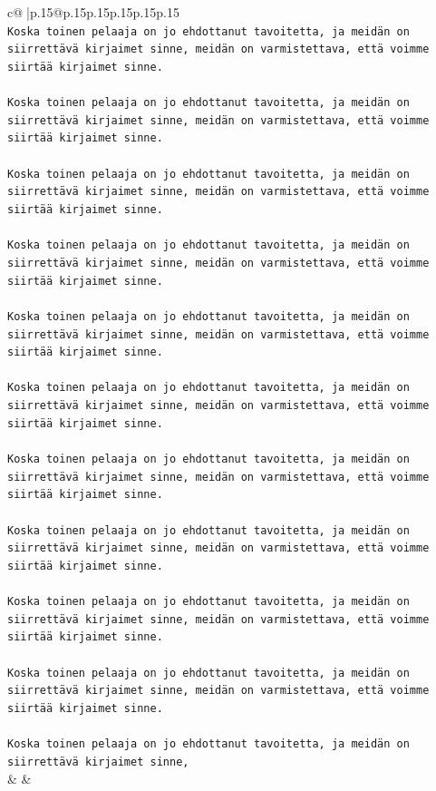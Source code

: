 \documentclass{article}
\begin{document}
{\begin{supertabular}{c@{$\;$}|p{.15\linewidth}@{}p{.15\linewidth}p{.15\linewidth}p{.15\linewidth}p{.15\linewidth}p{.15\linewidth}}
{{{\\ 
\texttt{Koska toinen pelaaja on jo ehdottanut tavoitetta, ja meidän on siirrettävä kirjaimet sinne, meidän on varmistettava, että voimme siirtää kirjaimet sinne.} \\
\\ 
\texttt{Koska toinen pelaaja on jo ehdottanut tavoitetta, ja meidän on siirrettävä kirjaimet sinne, meidän on varmistettava, että voimme siirtää kirjaimet sinne.} \\
\\ 
\texttt{Koska toinen pelaaja on jo ehdottanut tavoitetta, ja meidän on siirrettävä kirjaimet sinne, meidän on varmistettava, että voimme siirtää kirjaimet sinne.} \\
\\ 
\texttt{Koska toinen pelaaja on jo ehdottanut tavoitetta, ja meidän on siirrettävä kirjaimet sinne, meidän on varmistettava, että voimme siirtää kirjaimet sinne.} \\
\\ 
\texttt{Koska toinen pelaaja on jo ehdottanut tavoitetta, ja meidän on siirrettävä kirjaimet sinne, meidän on varmistettava, että voimme siirtää kirjaimet sinne.} \\
\\ 
\texttt{Koska toinen pelaaja on jo ehdottanut tavoitetta, ja meidän on siirrettävä kirjaimet sinne, meidän on varmistettava, että voimme siirtää kirjaimet sinne.} \\
\\ 
\texttt{Koska toinen pelaaja on jo ehdottanut tavoitetta, ja meidän on siirrettävä kirjaimet sinne, meidän on varmistettava, että voimme siirtää kirjaimet sinne.} \\
\\ 
\texttt{Koska toinen pelaaja on jo ehdottanut tavoitetta, ja meidän on siirrettävä kirjaimet sinne, meidän on varmistettava, että voimme siirtää kirjaimet sinne.} \\
\\ 
\texttt{Koska toinen pelaaja on jo ehdottanut tavoitetta, ja meidän on siirrettävä kirjaimet sinne, meidän on varmistettava, että voimme siirtää kirjaimet sinne.} \\
\\ 
\texttt{Koska toinen pelaaja on jo ehdottanut tavoitetta, ja meidän on siirrettävä kirjaimet sinne, meidän on varmistettava, että voimme siirtää kirjaimet sinne.} \\
\\ 
\texttt{Koska toinen pelaaja on jo ehdottanut tavoitetta, ja meidän on siirrettävä kirjaimet sinne,} \\
            }
        }
    }
    & & \\ \\


\end{supertabular}}
\end{document}
